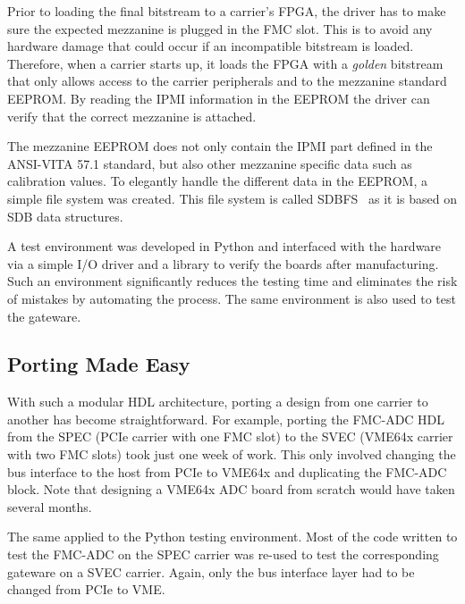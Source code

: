 \documentclass{JAC2003}
\begin{document}
Prior to loading the final bitstream to a carrier's FPGA, the driver has to make sure the expected mezzanine is plugged in the FMC slot.
This is to avoid any hardware damage that could occur if an incompatible bitstream is loaded.
Therefore, when a carrier starts up, it loads the FPGA with a \textit{golden} bitstream that only allows access to the carrier peripherals and to the mezzanine standard EEPROM.
By reading the IPMI information in the EEPROM the driver can verify that the correct mezzanine is attached.

The mezzanine EEPROM does not only contain the IPMI part defined in the ANSI-VITA 57.1 standard, but also other mezzanine specific data such as calibration values.
To elegantly handle the different data in the EEPROM, a simple file system was created.
This file system is called SDBFS~\cite{sdbfs} as it is based on SDB data structures.



A test environment was developed in Python and interfaced with the hardware via a simple I/O driver and a library to verify the boards after manufacturing.
Such an environment significantly reduces the testing time and eliminates the risk of mistakes by automating the process.
The same environment is also used to test the gateware.

\subsection{Porting Made Easy}
With such a modular HDL architecture, porting a design from one carrier to another has become straightforward.
For example, porting the FMC-ADC HDL from the SPEC (PCIe carrier with one FMC slot) to the SVEC (VME64x carrier with two FMC slots) took just one week of work.
This only involved changing the bus interface to the host from PCIe to VME64x and duplicating the FMC-ADC block.
Note that designing a VME64x ADC board from scratch would have taken several months.

The same applied to the Python testing environment.
Most of the code written to test the FMC-ADC on the SPEC carrier was re-used to test the corresponding gateware on a SVEC carrier.
Again, only the bus interface layer had to be changed from PCIe to VME.
\end{document}
